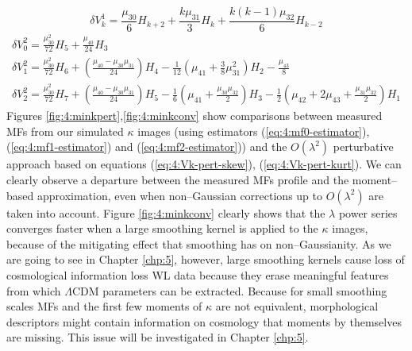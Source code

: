\begin{equation}
\label{eq:4:Vk-pert-skew}
\delta V^1_k = \frac{\mu_{30}}{6}H_{k+2} + \frac{k\mu_{31}}{3}H_k + \frac{k(k-1)\mu_{32}}{6}H_{k-2}
\end{equation}
%
\begin{equation}
\label{eq:4:Vk-pert-kurt}
\begin{gathered}
\displaystyle \delta V^2_0 = \frac{\mu_{30}^2}{72}H_5 + \frac{\mu_{40}}{24}H_3 \\
\displaystyle \delta V^2_1 = \frac{\mu_{30}^2}{72}H_6 + \left(\frac{\mu_{40}-\mu_{30}\mu_{31}}{24}\right)H_4 - \frac{1}{12}\left(\mu_{41}+\frac{3}{8}\mu_{31}^2\right)H_2 - \frac{\mu_{43}}{8}  \\ 
\displaystyle \delta V^2_2 = \frac{\mu_{30}^2}{72}H_7 + \left(\frac{\mu_{40}-\mu_{30}\mu_{31}}{24}\right)H_5 - \frac{1}{6}\left(\mu_{41}+\frac{\mu_{30}\mu_{32}}{2}\right)H_3 - \frac{1}{2}\left(\mu_{42}+2\mu_{43}+\frac{\mu_{31}\mu_{32}}{2}\right)H_1 
\end{gathered}
\end{equation}
%
Figures \ref{fig:4:minkpert},\ref{fig:4:minkconv} show comparisons between measured MFs from our simulated $\kappa$ images (using estimators (\ref{eq:4:mf0-estimator}), (\ref{eq:4:mf1-estimator}) and (\ref{eq:4:mf2-estimator})) and the $O(\lambda^2)$ perturbative approach based on equations (\ref{eq:4:Vk-pert-skew}), (\ref{eq:4:Vk-pert-kurt}). We can clearly observe a departure between the measured MFs profile and the moment--based approximation, even when non--Gaussian corrections up to $O(\lambda^2)$ are taken into account. Figure \ref{fig:4:minkconv} clearly shows that the $\lambda$ power series converges faster when a large smoothing kernel is applied to the $\kappa$ images, because of the mitigating effect that smoothing has on non--Gaussianity. As we are going to see in Chapter \ref{chp:5}, however, large smoothing kernels cause loss of cosmological information loss WL data because they erase meaningful features from which $\Lambda$CDM parameters can be extracted. Because for small smoothing scales MFs and the first few moments of $\kappa$ are not equivalent, morphological descriptors might contain information on cosmology that moments by themselves are missing. This issue will be investigated in Chapter \ref{chp:5}.    



